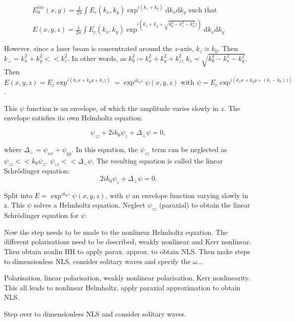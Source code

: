 \begin{gather}
  E_0^{inc}(x,y) = \frac{1}{2\pi}\int E_c(k_x,k_y)\exp^{i(k_x+k_y)}\mathrm{d}k_x\mathrm{d}k_y\text{ such that }\\
  E(x,y,z) =  \frac{1}{2\pi}\int E_c(k_x,k_y)\exp^{i(k_x+k_y+\sqrt{k_0^2-k_x^2-k_y^2}z)}\mathrm{d}k_x\mathrm{d}k_y
\end{gather}

However, since a laser beam is concentrated around the $z$-axis, $k_z\approx k_0$.
Then $k_\perp=k_x^2+k_y^2<<k_z^2$.
In other words, as $k_0^2\coloneqq k_x^2+k_y^2+k_z^2$, $k_z = \sqrt{k_0^2-k_x^2-k_y^2}$.
Then $E(x,y,z)=E_c\exp^{i(k_x x+k_y y+k_z z)}=\exp^{ik_0z}\psi(x,y,z)\text{ with }\psi=E_c\exp^{i(k_x x+k_y y+(k_z-k_0)z)}$.

This $\psi$ function is an envelope, of which the amplitude varies slowly in $z$.
The envelope satisfies its own Helmholtz equation:

\begin{equation}
  \psi_{zz}+2ik_0\psi_z+\Delta_\perp\psi=0,
\end{equation}

where $\Delta_\perp=\psi_{xx}+\psi_{yy}$.
In this equation, the $\psi_{zz}$ term can be neglected as $\psi_{zz}<<k_0\psi_z,~\psi_{zz}<<\Delta_\perp\psi$.
The resulting equation is called the linear Schr\"odinger equation:
\begin{equation}
  2ik_0\psi_z+\Delta_\perp\psi=0.\tag{Linear Schr\"odinger}
\end{equation}

\seperate

Split into $E=\exp^{ik_0z}\psi(x,y,z)$, with $\psi$ an envelope function varying slowly in z.
This $\psi$ solves a Helmholtz equation.
Neglect $\psi_{zz}$ (paraxial) to obtain the linear Schr\"odinger equation for $\psi$.

\seperate

{\color{red} Now the step needs to be made to the nonlinear Helmholtz equation. The different polarisations need to be described, weakly nonlinear and Kerr nonlinear. Then obtain nonlin HH to apply parax. approx. to obtain NLS. Then make steps to dimensionless NLS, consider solitary waves and specify the $\omega$...}

Polarisation, linear polarisation, weakly nonlinear polarisation, Kerr nonlinearity.
This all leads to nonlinear Helmholtz, apply paraxial approximation to obtain NLS.

\seperate

Step over to dimensionless NLS and consider solitary waves.

